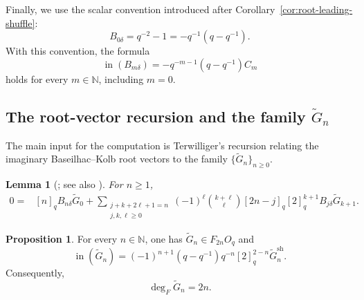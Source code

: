 \documentclass[11pt]{extarticle}
\newtheorem{lemma}[theorem]{Lemma}
\theoremstyle{definition}
\newtheorem{proposition}[theorem]{Proposition}
\theoremstyle{remark}
\numberwithin{equation}{section}
\newcommand{\N}{\mathbb N}
\newcommand{\Oq}{O_q}
\newcommand{\init}{\operatorname{in}}
\newcommand{\sh}{\mathrm{sh}}
\begin{document}
Finally, we use the scalar convention introduced after
Corollary~\ref{cor:root-leading-shuffle}:
\begin{equation}
\label{eq:B0delta-convention-alt}
        B_{0\delta}=q^{-2}-1=-q^{-1}(q-q^{-1}).
\end{equation}
With this convention, the formula
\[
        \init(B_{m\delta})
        =
        -q^{-m-1}(q-q^{-1})C_m
\]
holds for every \(m\in\N\), including \(m=0\).

\subsection{The root-vector recursion and the family \texorpdfstring{\(\widetilde G_n\)}{G-tilde n}}

The main input for the computation is Terwilliger's recursion relating the
imaginary Baseilhac--Kolb root vectors to the family
\(\{\widetilde G_n\}_{n\geq0}\).

\begin{lemma}[{{\cite[Equation~(133)]{Terwilliger2022OqACE}}; see also
{\cite[Lemma~12.5]{Terwilliger2022OqACE}}}]
\label{lem:root-tG-recursion}
For \(n\geq1\),
\begin{align}
0={}&[n]_qB_{n\delta}\widetilde G_0+\sum_{\substack{j+k+2\ell+1=n\\j,k,\ell\geq0}}
(-1)^\ell\binom{k+\ell}{\ell}
[2n-j]_q[2]_q^{k+1}B_{j\delta}\widetilde G_{k+1}.
\label{eq:root-tG-recursion}
\end{align}
\end{lemma}



\begin{proposition}
\label{prop:tG-leading}
For every $n\in\N$, one has $\widetilde G_n\in F_{2n}\Oq$ and
\begin{equation}
\label{eq:tG-leading}
\init(\widetilde G_n)
 =
 (-1)^{n+1}(q-q^{-1})q^{-n}[2]_q^{2-n}
 \widetilde G_n^{\sh}.
\end{equation}
Consequently,
\[
        \deg_F\widetilde G_n=2n .
\]
\end{proposition}
\end{document}

